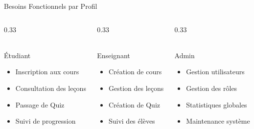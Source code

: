 \documentclass[10pt]{beamer}
\begin{document}
\begin{frame}{Besoins Fonctionnels par Profil}
    \begin{columns}[T]
        \begin{column}{0.33\textwidth}
            \begin{exampleblock}{\centering \faUserGrad \\ \'{E}tudiant}
                \tiny
                \begin{itemize}
                    \item Inscription aux cours
                    \item Consultation des le\c{c}ons
                    \item Passage de Quiz
                    \item Suivi de progression
                \end{itemize}
            \end{exampleblock}
        \end{column}
        \begin{column}{0.33\textwidth}
            \begin{exampleblock}{\centering \faChalkboardTeacher \\ Enseignant}
                \tiny
                \begin{itemize}
                    \item Cr\'{e}ation de cours
                    \item Gestion des le\c{c}ons
                    \item Cr\'{e}ation de Quiz
                    \item Suivi des \'{e}l\`{e}ves
                \end{itemize}
            \end{exampleblock}
        \end{column}
        \begin{column}{0.33\textwidth}
            \begin{exampleblock}{\centering \faUserShield \\ Admin}
                \tiny
                \begin{itemize}
                    \item Gestion utilisateurs
                    \item Gestion des r\^{o}les
                    \item Statistiques globales
                    \item Maintenance syst\`{e}me
                \end{itemize}
            \end{exampleblock}
        \end{column}
    \end{columns}
\end{frame}
\end{document}
